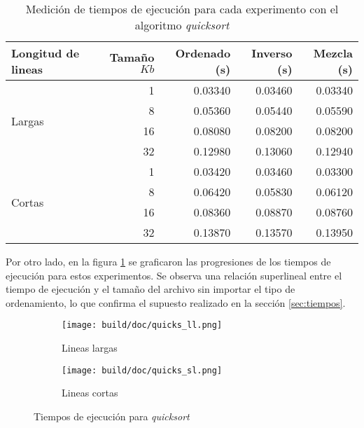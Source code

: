 \documentclass[a4paper,11pt]{article}
\begin{document}
\begin{table}[h!t]
\centering
\begin{tabular}{ | l | r | r | r |r | }
  \hline
  Longitud de lineas           & Tamaño \(Kb\) & Ordenado (s) & Inverso (s) & Mezcla (s) \\ \hline
   \multirow{4}{*}{Largas}     & 1             & 0.03340      & 0.03460     & 0.03340 \\
                               & 8             & 0.05360      & 0.05440     & 0.05590 \\
                               & 16            & 0.08080      & 0.08200     & 0.08200 \\
                               & 32            & 0.12980      & 0.13060     & 0.12940 \\ \hline
  \multirow{4}{*}{Cortas}      & 1             & 0.03420      & 0.03460     & 0.03300 \\
                               & 8             & 0.06420      & 0.05830     & 0.06120 \\
                               & 16            & 0.08360      & 0.08870     & 0.08760 \\
                               & 32            & 0.13870      & 0.13570     & 0.13950 \\
  \hline
\end{tabular}
\caption{Medición de tiempos de ejecución para cada experimento con el algoritmo \textit{quicksort}}
\label{tab:medicionesquick}
\end{table}

Por otro lado, en la figura \ref{fig:medicionesquick} se graficaron las
progresiones de los tiempos de ejecución para estos experimentos. Se observa
una relación superlineal entre el tiempo de ejecución y el tamaño del archivo
sin importar el tipo de ordenamiento, lo que confirma el supuesto realizado en
la sección \ref{sec:tiempos}.

\begin{figure}
  \begin{subfigure}[b]{\textwidth}
    \centering
    \texttt{[image: build/doc/quicks\_ll.png]}
    \caption{Lineas largas}
  \end{subfigure}%

  \begin{subfigure}[b]{\textwidth}
    \centering
    \texttt{[image: build/doc/quicks\_sl.png]}
    \caption{Lineas cortas}
  \end{subfigure}
  \caption{Tiempos de ejecución para \textit{quicksort}}\label{fig:medicionesquick}
\end{figure}
\end{document}
